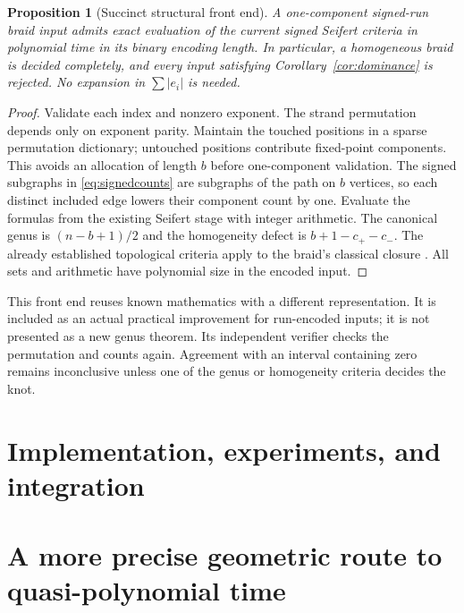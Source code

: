 \documentclass[11pt]{article}
\newtheorem{proposition}[theorem]{Proposition}
\theoremstyle{definition}
\theoremstyle{remark}
\begin{document}
\begin{proposition}[Succinct structural front end]
A one-component signed-run braid input admits exact evaluation of the current signed Seifert criteria in polynomial time in its binary encoding length. In particular, a homogeneous braid is decided completely, and every input satisfying Corollary~\ref{cor:dominance} is rejected. No expansion in $\sum|e_i|$ is needed.
\end{proposition}
\begin{proof}
Validate each index and nonzero exponent. The strand permutation depends only on exponent parity. Maintain the touched positions in a sparse permutation dictionary; untouched positions contribute fixed-point components. This avoids an allocation of length $b$ before one-component validation. The signed subgraphs in \eqref{eq:signedcounts} are subgraphs of the path on $b$ vertices, so each distinct included edge lowers their component count by one. Evaluate the formulas from the existing Seifert stage with integer arithmetic. The canonical genus is $(n-b+1)/2$ and the homogeneity defect is $b+1-c_+-c_-$. The already established topological criteria apply to the braid's classical closure \cite{cromwell,lobb,abe}. All sets and arithmetic have polynomial size in the encoded input.
\end{proof}

This front end reuses known mathematics with a different representation. It is included as an actual practical improvement for run-encoded inputs; it is not presented as a new genus theorem. Its independent verifier checks the permutation and counts again. Agreement with an interval containing zero remains inconclusive unless one of the genus or homogeneity criteria decides the knot.

\section{Implementation, experiments, and integration}
\label{sec:experiments}


\section{A more precise geometric route to quasi-polynomial time}
\label{sec:geometry}
\end{document}
